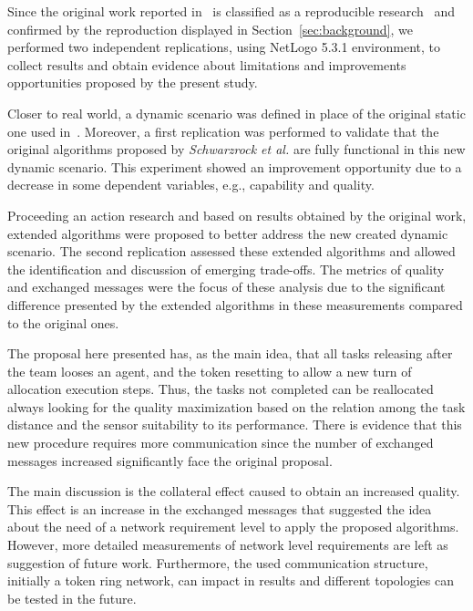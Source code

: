 Since the original work reported in~\cite{MAS07} is classified as a reproducible research~\cite{exp02} and confirmed by the reproduction displayed in Section~\ref{sec:background}, we performed two independent replications, using NetLogo 5.3.1 environment, to collect results and obtain evidence about limitations and improvements opportunities proposed by the present study.

Closer to real world, a dynamic scenario was defined in place of the original static one used in~\cite{MAS07}. Moreover, a first replication was performed to validate that the original algorithms proposed by \textit{Schwarzrock et al.} are fully functional in this new dynamic scenario. This experiment showed an improvement opportunity due to a decrease in some dependent variables, e.g., capability and quality. 

Proceeding an action research and based on results obtained by the original work, extended algorithms were proposed to better address the new created dynamic scenario. The second replication assessed these extended algorithms and allowed the identification and discussion of emerging trade-offs. The metrics of quality and exchanged messages were the focus of these analysis due to the significant difference presented by the extended algorithms in these measurements compared to the original ones.

The proposal here presented has, as the main idea, that all tasks releasing after the team looses an agent, and the token resetting to allow a new turn of allocation execution steps. Thus, the tasks not completed can be reallocated always looking for the quality maximization based on the relation among the task distance and the sensor suitability to its performance. There is evidence that this new procedure requires more communication since the number of exchanged messages increased significantly face the original proposal.

The main discussion is the collateral effect caused to obtain an increased quality. This effect is an increase in the exchanged messages that suggested the idea about the need of a network requirement level to apply the proposed algorithms. However, more detailed measurements of network level requirements are left as suggestion of future work. Furthermore, the used communication structure, initially a token ring network, can impact in results and different topologies can be tested in the future.